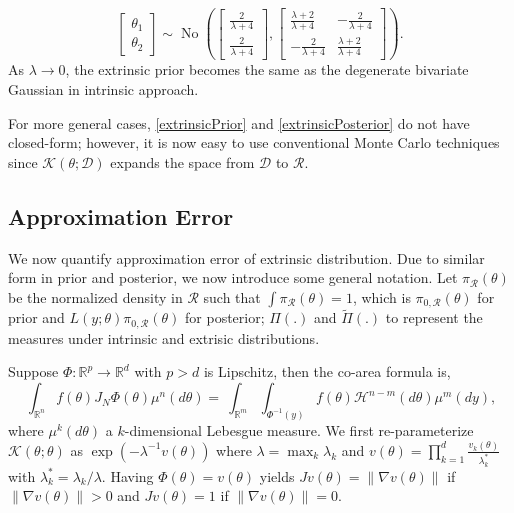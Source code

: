 \documentclass[10pt]{article}
\newcommand{\mc}[1]{\mathcal{#1}}
\DeclareMathOperator{\No}{No}
\DeclareMathOperator{\1}{\mathbbm{1}}
\begin{document}
$$\begin{bmatrix} \theta_1 \\ \theta_2 \end{bmatrix} \sim
\No \left(
 \begin{bmatrix} \frac{2}{\lambda+4} \\ \frac{2}{\lambda+4} \end{bmatrix},
\begin{bmatrix} \frac{\lambda+2}{\lambda+4} & -\frac{2}{\lambda+4}  \\  -\frac{2}{\lambda+4}  &\frac{\lambda+2}{\lambda+4} \end{bmatrix}
\right).$$
As $\lambda\rightarrow 0$, the extrinsic prior becomes the same as the degenerate bivariate Gaussian in intrinsic approach.

For more general cases, \eqref{extrinsicPrior} and \eqref{extrinsicPosterior} do not have closed-form; however, it is now easy to use conventional Monte Carlo techniques since $\mc K(\theta;\mc D)$ expands the space from $\mc D$ to $\mc R$.

\subsection{Approximation Error}
We now quantify approximation error of extrinsic distribution. Due to similar form in prior and posterior, we now introduce some general notation. Let $\pi_{\mc R}(\theta)$ be the normalized density in $\mc R$ such that $\int \pi_{\mc R}(\theta)=1$, which is $\pi_{0,\mc R}(\theta)$ for prior and $L(y;\theta)\pi_{0,\mc R}(\theta)$ for posterior; $\Pi(.)$ and $\tilde\Pi(.)$ to represent the measures under intrinsic and extrisic distributions. 

Suppose $\Phi:\mathbb R^p \rightarrow \mathbb R^d$ with $p>d$ is Lipschitz, then the co-area formula \citep{federer2014geometric} is,
	\begin{equation}
\ \int_{\mathbb{R}^n}  f(\theta)J_N\Phi(\theta)\mu^n(d \theta)
	=\ \int_{\mathbb{R}^m}  \int_{\Phi^{-1}(y)}f(\theta) \mc H^{n-m}(d\theta)\mu^m(d y),
	\end{equation}
where $\mu^k(d\theta)$ a $k$-dimensional Lebesgue measure. We first re-parameterize $\mc K(\theta;\theta)$ as $\exp(-\lambda^{-1}  v(\theta))$ where $\lambda=\max_k \lambda_k$ and $v(\theta)=\prod_{k=1}^d\frac{v_k(\theta)}{\lambda^*_k}$ with $\lambda^*_k=\lambda_k/\lambda$. Having $\Phi(\theta)=v(\theta)$ yields $J v(\theta)=\|\nabla v(\theta)\|$ if $\|\nabla v(\theta)\|>0$ and $J v(\theta)=1$ if $\|\nabla v(\theta)\|=0$.
\end{document}
